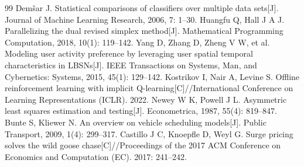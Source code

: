 \begin{thebibliography}{99}
 Dem\v{s}ar J. Statistical comparisons of classifiers over multiple data sets[J]. Journal of Machine Learning Research, 2006, 7: 1--30.
 Huangfu Q, Hall J A J. Parallelizing the dual revised simplex method[J]. Mathematical Programming Computation, 2018, 10(1): 119--142.
 Yang D, Zhang D, Zheng V W, et al. Modeling user activity preference by leveraging user spatial temporal characteristics in LBSNs[J]. IEEE Transactions on Systems, Man, and Cybernetics: Systems, 2015, 45(1): 129--142.
 Kostrikov I, Nair A, Levine S. Offline reinforcement learning with implicit Q-learning[C]//International Conference on Learning Representations (ICLR). 2022.
 Newey W K, Powell J L. Asymmetric least squares estimation and testing[J]. Econometrica, 1987, 55(4): 819--847.
 Bunte S, Kliewer N. An overview on vehicle scheduling models[J]. Public Transport, 2009, 1(4): 299--317.
 Castillo J C, Knoepfle D, Weyl G. Surge pricing solves the wild goose chase[C]//Proceedings of the 2017 ACM Conference on Economics and Computation (EC). 2017: 241--242.
\end{thebibliography}
